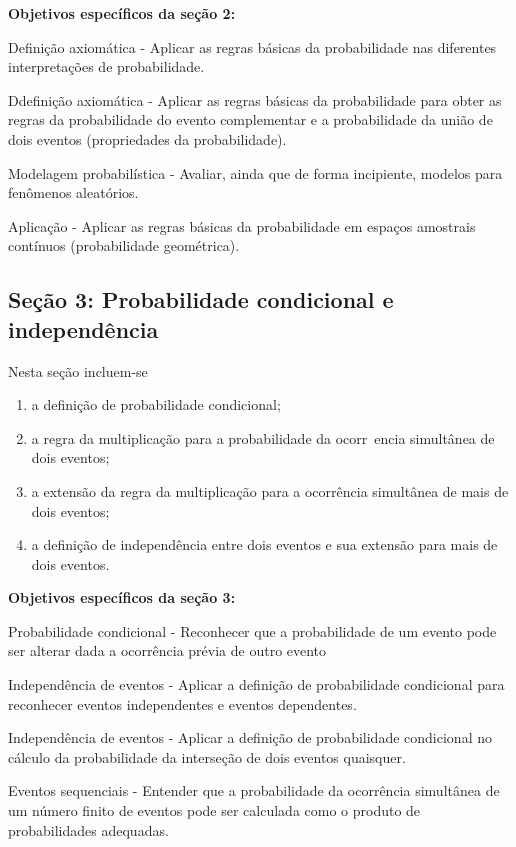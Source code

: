 \begin{apresentacao}
\textbf{Objetivos específicos da seção 2:}
\begin{OES}\setcounter{enumi}{5}
\item Definição axiomática - Aplicar as regras básicas da probabilidade nas diferentes interpretações de probabilidade.
\item  Ddefinição axiomática - Aplicar as regras básicas da probabilidade para obter as regras da probabilidade do evento complementar e a probabilidade da união de dois eventos (propriedades da probabilidade).
\item  Modelagem probabilística - Avaliar, ainda que de forma incipiente, modelos para fenômenos aleatórios.
\item  Aplicação - Aplicar as regras básicas da probabilidade em espaços amostrais contínuos (probabilidade geométrica).
\end{OES}

\subsection{Seção 3: Probabilidade condicional e independência}
Nesta seção incluem-se
\begin{enumerate}
\item a definição de probabilidade condicional;
\item a regra da multiplicação para a probabilidade da ocorr~encia simultânea de dois eventos;
\item a extensão da regra da multiplicação para a ocorrência simultânea de mais de dois eventos;
\item a definição de independência entre dois eventos e sua extensão para mais de dois eventos.
\end{enumerate}

\textbf{Objetivos específicos da seção 3:}
\begin{OES}\setcounter{enumi}{9}
\item Probabilidade condicional - Reconhecer que a probabilidade de um evento pode ser alterar dada a ocorrência prévia de outro evento
\item Independência de eventos - Aplicar a definição de probabilidade condicional para reconhecer eventos independentes e eventos dependentes.
\item Independência de eventos - Aplicar a definição de probabilidade condicional no cálculo da probabilidade da interseção de dois eventos quaisquer.
\item Eventos sequenciais - Entender que a probabilidade da ocorrência simultânea de um número finito de eventos pode ser calculada como o produto de probabilidades adequadas.
\end{OES}


\end{apresentacao}
